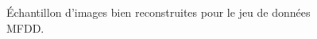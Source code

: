 \begin{figure}[h]
    \caption{Échantillon d'images bien reconstruites pour le jeu de données MFDD.}
\label{sum_fig:num_reconstructed}
\end{figure}

